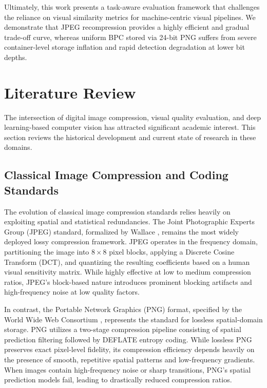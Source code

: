 \documentclass[12pt, a4paper]{article}
\begin{document}
Ultimately, this work presents a task-aware evaluation framework that challenges the reliance on visual similarity metrics for machine-centric visual pipelines. We demonstrate that JPEG recompression provides a highly efficient and gradual trade-off curve, whereas uniform BPC stored via 24-bit PNG suffers from severe container-level storage inflation and rapid detection degradation at lower bit depths.

\section{Literature Review}
The intersection of digital image compression, visual quality evaluation, and deep learning-based computer vision has attracted significant academic interest. This section reviews the historical development and current state of research in these domains.

\subsection{Classical Image Compression and Coding Standards}
The evolution of classical image compression standards relies heavily on exploiting spatial and statistical redundancies. The Joint Photographic Experts Group (JPEG) standard, formalized by Wallace \cite{wallace1992}, remains the most widely deployed lossy compression framework. JPEG operates in the frequency domain, partitioning the image into $8\times8$ pixel blocks, applying a Discrete Cosine Transform (DCT), and quantizing the resulting coefficients based on a human visual sensitivity matrix. While highly effective at low to medium compression ratios, JPEG's block-based nature introduces prominent blocking artifacts and high-frequency noise at low quality factors.

In contrast, the Portable Network Graphics (PNG) format, specified by the World Wide Web Consortium \cite{w3c2003}, represents the standard for lossless spatial-domain storage. PNG utilizes a two-stage compression pipeline consisting of spatial prediction filtering followed by DEFLATE entropy coding. While lossless PNG preserves exact pixel-level fidelity, its compression efficiency depends heavily on the presence of smooth, repetitive spatial patterns and low-frequency gradients. When images contain high-frequency noise or sharp transitions, PNG's spatial prediction models fail, leading to drastically reduced compression ratios.
\end{document}
